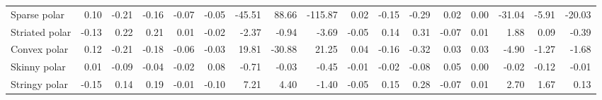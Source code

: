 \documentclass{article}
\begin{document}
\begin{table}[!ht]
{\begin{tabular}{lrrrrrrrrrrrrrrrr}
Sparse polar                                                            & 0.10                     & -0.21                    & -0.16                    & -0.07                    & -0.05                    & -45.51                   & 88.66                    & -115.87                  & 0.02                     & -0.15                    & -0.29                    & 0.02                     & 0.00                     & -31.04                   & -5.91                    & -20.03                   \\
Striated polar                                                          & -0.13                    & 0.22                     & 0.21                     & 0.01                     & -0.02                    & -2.37                    & -0.94                    & -3.69                    & -0.05                    & 0.14                     & 0.31                     & -0.07                    & 0.01                     & 1.88                     & 0.09                     & -0.39                    \\
Convex polar                                                            & 0.12                     & -0.21                    & -0.18                    & -0.06                    & -0.03                    & 19.81                    & -30.88                   & 21.25                    & 0.04                     & -0.16                    & -0.32                    & 0.03                     & 0.03                     & -4.90                    & -1.27                    & -1.68                    \\
Skinny polar                                                            & 0.01                     & -0.09                    & -0.04                    & -0.02                    & 0.08                     & -0.71                    & -0.03                    & -0.45                    & -0.01                    & -0.02                    & -0.08                    & 0.05                     & 0.00                     & -0.02                    & -0.12                    & -0.01                    \\
Stringy polar                                                           & -0.15                    & 0.14                     & 0.19                     & -0.01                    & -0.10                    & 7.21                     & 4.40                     & -1.40                    & -0.05                    & 0.15                     & 0.28                     & -0.07                    & 0.01                     & 2.70                     & 1.67                     & 0.13                     \\

\end{tabular}}
\end{table}
\end{document}
